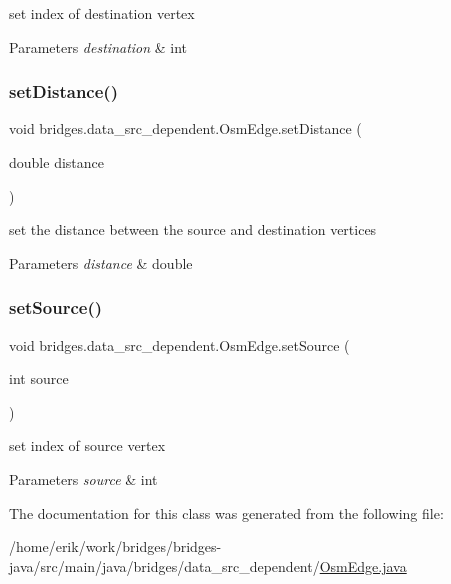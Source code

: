 set index of destination vertex 
\begin{DoxyParams}{Parameters}
{\em destination} & int \\
\hline
\end{DoxyParams}
\mbox{\label{classbridges_1_1data__src__dependent_1_1_osm_edge_afe9d2fa452c89d08d7c1a23ff3302c62}} 
\subsubsection{\texorpdfstring{set\+Distance()}{setDistance()}}
{\footnotesize\ttfamily void bridges.\+data\+\_\+src\+\_\+dependent.\+Osm\+Edge.\+set\+Distance (\begin{DoxyParamCaption}\item[{double}]{distance }\end{DoxyParamCaption})}

set the distance between the source and destination vertices 
\begin{DoxyParams}{Parameters}
{\em distance} & double \\
\hline
\end{DoxyParams}
\mbox{\label{classbridges_1_1data__src__dependent_1_1_osm_edge_aa61fb02ce746b89c26c71cd2f20053e7}} 
\subsubsection{\texorpdfstring{set\+Source()}{setSource()}}
{\footnotesize\ttfamily void bridges.\+data\+\_\+src\+\_\+dependent.\+Osm\+Edge.\+set\+Source (\begin{DoxyParamCaption}\item[{int}]{source }\end{DoxyParamCaption})}

set index of source vertex 
\begin{DoxyParams}{Parameters}
{\em source} & int \\
\hline
\end{DoxyParams}


The documentation for this class was generated from the following file\+:\begin{DoxyCompactItemize}
\item 
/home/erik/work/bridges/bridges-\/java/src/main/java/bridges/data\+\_\+src\+\_\+dependent/\hyperlink{_osm_edge_8java}{Osm\+Edge.\+java}\end{DoxyCompactItemize}
